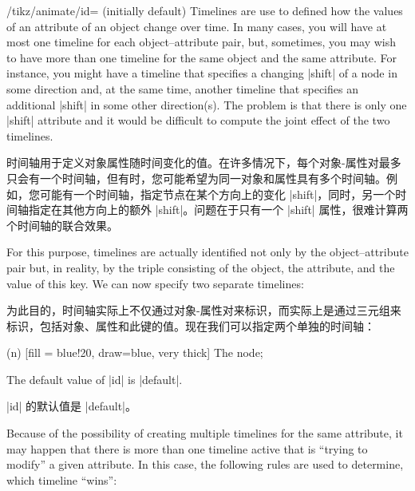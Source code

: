 \begin{key}{/tikz/animate/id= (initially default)}
    Timelines are use to defined how the values of an attribute of an object
    change over time. In many cases, you will have at most one timeline for
    each object--attribute pair, but, sometimes, you may wish to have more than
    one timeline for the same object and the same attribute. For instance, you
    might have a timeline that specifies a changing |shift| of a node in some
    direction and, at the same time, another timeline that specifies an
    additional |shift| in some other direction(s). The problem is that there is
    only one |shift| attribute and it would be difficult to compute the joint
    effect of the two timelines.

    时间轴用于定义对象属性随时间变化的值。在许多情况下，每个对象-属性对最多只会有一个时间轴，但有时，您可能希望为同一对象和属性具有多个时间轴。例如，您可能有一个时间轴，指定节点在某个方向上的变化 |shift|，同时，另一个时间轴指定在其他方向上的额外 |shift|。问题在于只有一个 |shift| 属性，很难计算两个时间轴的联合效果。



    For this purpose, timelines are actually identified not only by the
    object--attribute pair but, in reality, by the triple consisting of the
    object, the attribute, and the value of this key. We can now specify two
    separate timelines:

    为此目的，时间轴实际上不仅通过对象-属性对来标识，而实际上是通过三元组来标识，包括对象、属性和此键的值。现在我们可以指定两个单独的时间轴：


\begin{codeexample}[
    preamble={\usetikzlibrary{animations}},
    animation list={0.5,1,1.5,2},
]
\tikz [animate = {
  id = 1, n:shift = { 0s = "{(0,0)}", 2s = "{(0,5mm)}", begin on = click },
  id = 2, n:shift = { 0s = "{(0,0)}", 2s = "{(5mm,0)}", begin on = click }
}]
  \node (n) [fill = blue!20, draw=blue, very thick] {The node};
\end{codeexample}

    The default value of |id| is |default|.

    |id| 的默认值是 |default|。


\end{key}

Because of the possibility of creating multiple timelines for the same
attribute, it may happen that there is more than one timeline active that is
``trying to modify'' a given attribute. In this case, the following rules are
used to determine, which timeline ``wins'':

